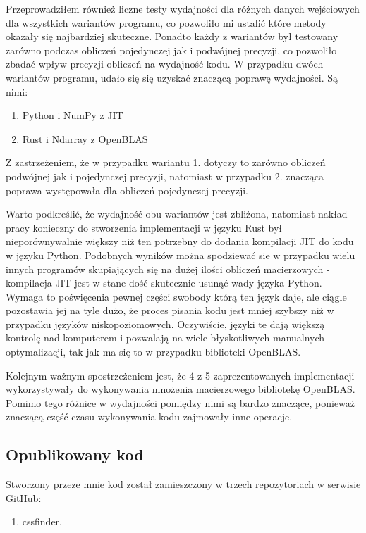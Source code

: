\documentclass[11pt, a4paper]{article}
\begin{document}
\begin{sloppypar}
    Przeprowadziłem również liczne testy wydajności dla różnych danych wejściowych dla
    wszystkich wariantów programu, co pozwoliło mi ustalić które metody okazały się najbardziej
    skuteczne. Ponadto każdy z wariantów był testowany zarówno podczas obliczeń
    pojedynczej jak i podwójnej precyzji, co pozwoliło zbadać wpływ precyzji obliczeń na
    wydajność kodu. W przypadku dwóch wariantów programu, udało się się uzyskać znaczącą
    poprawę wydajności. Są nimi:
    \begin{enumerate}
      \item Python i NumPy z JIT

      \item Rust i Ndarray z OpenBLAS
    \end{enumerate}
    Z zastrzeżeniem, że w przypadku wariantu 1. dotyczy to zarówno obliczeń podwójnej
    jak i pojedynczej precyzji, natomiast w przypadku 2. znacząca poprawa występowała dla
    obliczeń pojedynczej precyzji.

    Warto podkreślić, że wydajność obu wariantów jest zbliżona, natomiast nakład pracy konieczny
    do stworzenia implementacji w języku Rust był nieporównywalnie większy niż ten potrzebny
    do dodania kompilacji JIT do kodu w języku Python. Podobnych wyników można
    spodziewać sie w przypadku wielu innych programów skupiających się na dużej ilości
    obliczeń macierzowych - kompilacja JIT jest w stane dość skutecznie usunąć wady
    języka Python. Wymaga to poświęcenia pewnej części swobody którą ten język daje, ale
    ciągle pozostawia jej na tyle dużo, że proces pisania kodu jest mniej szybszy niż w przypadku
    języków niskopoziomowych. Oczywiście, języki te dają większą kontrolę nad komputerem
    i pozwalają na wiele błyskotliwych manualnych optymalizacji, tak jak ma się to w
    przypadku biblioteki OpenBLAS.

    Kolejnym ważnym spostrzeżeniem jest, że 4 z 5 zaprezentowanych implementacji wykorzystywały
    do wykonywania mnożenia macierzowego bibliotekę OpenBLAS. Pomimo tego różnice w
    wydajności pomiędzy nimi są bardzo znaczące, ponieważ znaczącą część czasu wykonywania
    kodu zajmowały inne operacje.

    \subsection{Opublikowany kod}


    Stworzony przeze mnie kod został zamieszczony w trzech repozytoriach w serwisie GitHub:
    \begin{enumerate}
      \item cssfinder\cite{CSSFinder_New},


\end{enumerate}
\end{sloppypar}
\end{document}
